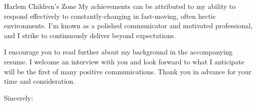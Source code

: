 \documentclass[
    jphafner,
    fontsize=11pt,
    foldmarks=false,
    pagenumber=false,
    addrfield=true,
]{scrlttr2}
\begin{document}
\begin{letter}{Harlem Children's Zone}
My achievements can be attributed to my ability to respond effectively to constantly-changing in fast-moving, often hectic environments. 
    I'm known as a polished communicator and motivated professional, and I strike to continuously deliver beyond expectations.


I encourage you to read further about my background in the accompanying resume. 
    I welcome an interview with you and look forward to what I anticipate will be the first of many positive communications. 
    Thank you in advance for your time and consideration.



\closing{Sincerely:}
\end{letter}
\end{document}
